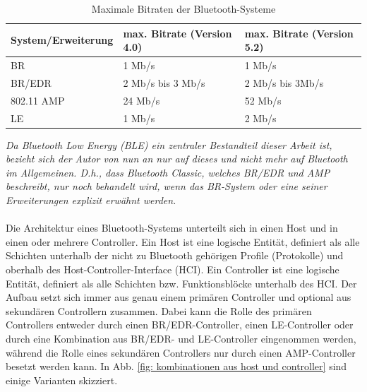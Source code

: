 \begin{table}
    \begin{tabular}[h]{|l|l|l|}
    \hline
    \textbf{System/Erweiterung} & \textbf{max. Bitrate (Version 4.0)} & \textbf{max. Bitrate (Version 5.2)} \\
    \hline
    BR          & 1 Mb/s \cite{BtSpec4.0_124}               & 1 Mb/s \cite{BtSpec5.2_188}           \\
    \hline
    BR/EDR      & 2 Mb/s bis 3 Mb/s \cite{BtSpec4.0_124}    & 2 Mb/s bis 3Mb/s \cite{BtSpec5.2_188} \\
    \hline
    802.11 AMP  & 24 Mb/s \cite{BtSpec4.0_123}              & 52 Mb/s \cite{BtSpec5.2_187}          \\
    \hline
    LE          & 1 Mb/s \cite{BtSpec4.0_126}               & 2 Mb/s \cite{BtSpec5.2_190}           \\
    \hline
    \end{tabular}
    \caption[Maximale Bitraten der Bluetooth-Systeme]{Maximale Bitraten der Bluetooth-Systeme}
    \label{tab: maximale Bitraten BT}
\end{table}

\textit{Da Bluetooth Low Energy (BLE) ein zentraler Bestandteil dieser Arbeit ist, bezieht sich der Autor von nun an nur auf dieses und nicht mehr auf Bluetooth im Allgemeinen. D.h., dass Bluetooth Classic, welches BR/EDR und AMP beschreibt, nur noch behandelt wird, wenn das BR-System oder eine seiner Erweiterungen explizit erwähnt werden.}
\\\\
Die Architektur eines Bluetooth-Systems unterteilt sich in einen Host und in einen oder mehrere Controller. Ein Host ist eine logische Entität, definiert als alle Schichten unterhalb der nicht zu Bluetooth gehörigen Profile (Protokolle) und oberhalb des Host-Controller-Interface (HCI). Ein Controller ist eine logische Entität, definiert als alle Schichten bzw. Funktionsblöcke unterhalb des HCI. Der Aufbau setzt sich immer aus genau einem primären Controller und optional aus sekundären Controllern zusammen. Dabei kann die Rolle des primären Controllers entweder durch einen BR/EDR-Controller, einen LE-Controller oder durch eine Kombination aus BR/EDR- und LE-Controller eingenommen werden, während die Rolle eines sekundären Controllers nur durch einen AMP-Controller besetzt werden kann. In Abb. \ref{fig: kombinationen aus host und controller} sind einige Varianten skizziert. 

